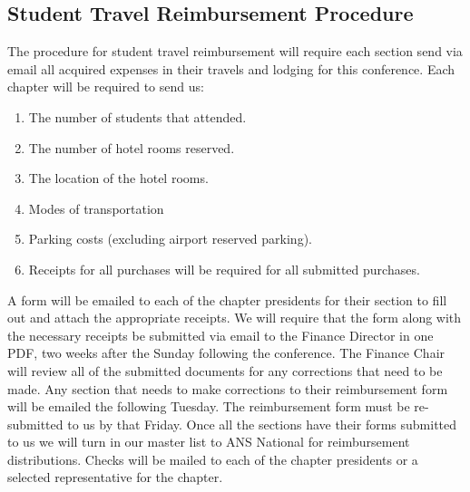 \subsection{Student Travel Reimbursement Procedure}
The procedure for student travel reimbursement will require each section send via email all acquired expenses in their travels and lodging for this conference. Each chapter will be required to send us:
\begin{enumerate}
    \item The number of students that attended.
    \item The number of hotel rooms reserved.
    \item The location of the hotel rooms.
    \item Modes of transportation
    \item Parking costs (excluding airport reserved parking).
    \item Receipts for all purchases will be required for all submitted purchases.
\end{enumerate}
A form will be emailed to each of the chapter presidents for their section to fill out and attach the appropriate receipts. We will require that the form along with the necessary receipts be submitted via email to the Finance Director in one PDF, two weeks after the Sunday following the conference. The Finance Chair will review all of the submitted documents for any corrections that need to be made. Any section that needs to make corrections to their reimbursement form will be emailed the following Tuesday. The reimbursement form must be re-submitted to us by that Friday. Once all the sections have their forms submitted to us we will turn in our master list to ANS National for reimbursement distributions. Checks will be mailed to each of the chapter presidents or a selected representative for the chapter.